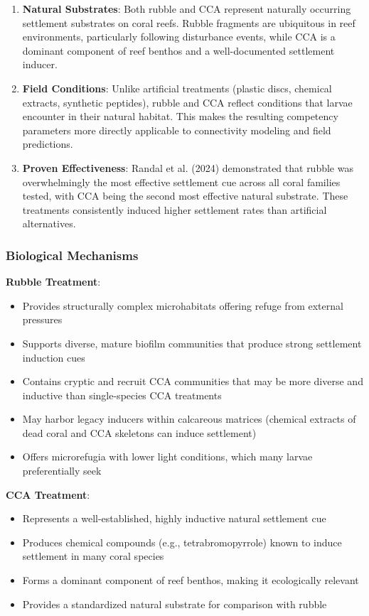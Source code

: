 \documentclass[11pt]{article}
\begin{document}
\begin{enumerate}
    \item \textbf{Natural Substrates}: Both rubble and CCA represent naturally occurring settlement substrates on coral reefs. Rubble fragments are ubiquitous in reef environments, particularly following disturbance events, while CCA is a dominant component of reef benthos and a well-documented settlement inducer.
    
    \item \textbf{Field Conditions}: Unlike artificial treatments (plastic discs, chemical extracts, synthetic peptides), rubble and CCA reflect conditions that larvae encounter in their natural habitat. This makes the resulting competency parameters more directly applicable to connectivity modeling and field predictions.
    
    \item \textbf{Proven Effectiveness}: Randal et al. (2024) demonstrated that rubble was overwhelmingly the most effective settlement cue across all coral families tested, with CCA being the second most effective natural substrate. These treatments consistently induced higher settlement rates than artificial alternatives.
\end{enumerate}

\subsubsection{Biological Mechanisms}

\textbf{Rubble Treatment}:
\begin{itemize}
    \item Provides structurally complex microhabitats offering refuge from external pressures
    \item Supports diverse, mature biofilm communities that produce strong settlement induction cues
    \item Contains cryptic and recruit CCA communities that may be more diverse and inductive than single-species CCA treatments
    \item May harbor legacy inducers within calcareous matrices (chemical extracts of dead coral and CCA skeletons can induce settlement)
    \item Offers microrefugia with lower light conditions, which many larvae preferentially seek
\end{itemize}

\textbf{CCA Treatment}:
\begin{itemize}
    \item Represents a well-established, highly inductive natural settlement cue
    \item Produces chemical compounds (e.g., tetrabromopyrrole) known to induce settlement in many coral species
    \item Forms a dominant component of reef benthos, making it ecologically relevant
    \item Provides a standardized natural substrate for comparison with rubble
\end{itemize}
\end{document}

